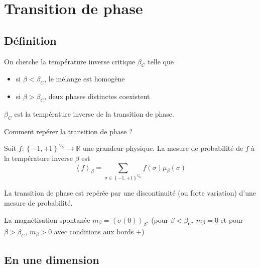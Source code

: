 \documentclass[french]{beamer}
\begin{document}
\section{Transition de phase}
\subsection{Définition}

\begin{frame}
    On cherche la température inverse critique $\beta_C$ telle que
    \begin{itemize}
        \item si $\beta < \beta_C$, le mélange est homogène
        \item si $\beta > \beta_C$, deux phases distinctes coexistent
    \end{itemize}
    $\beta_C$ est la température inverse de la transition de phase.
    
    Comment repérer la transition de phase ?
\end{frame}

\begin{frame}
\begin{definition}
    Soit $f : \left\{-1, +1\right\}^{V_G} \to \mathbb{R}$ une grandeur physique. La mesure de probabilité de $f$ à la température inverse $\beta$ est
    \[ \left\langle f \right\rangle_\beta = \sum_{\sigma \in \left\{-1, +1\right\}^{V_G}} f(\sigma)\mu_\beta(\sigma)\]
\end{definition}
La transition de phase est repérée par une discontinuité (ou forte variation) d'une mesure de probabilité.

\begin{example}
    La magnétisation spontanée $m_\beta = \left\langle \sigma(0) \right\rangle_\beta$. (pour $\beta < \beta_C$, $m_\beta = 0$ et pour $\beta > \beta_C$, $m_\beta > 0$ avec conditions aux bords $+$)
\end{example}
\end{frame}

%
\subsection{En une dimension}
%
\end{document}
